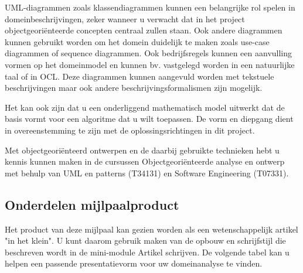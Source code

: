 UML‐diagrammen zoals klassendiagrammen kunnen een belangrijke rol spelen in
domeinbeschrijvingen, zeker wanneer u verwacht dat in het project
objectgeoriënteerde concepten centraal zullen staan. Ook andere diagrammen
kunnen gebruikt worden om het domein duidelijk te maken zoals use-case
diagrammen of sequence diagrammen. Ook bedrijfsregels kunnen een aanvulling
vormen op het domeinmodel en kunnen bv. vastgelegd worden in een natuurlijke
taal of in OCL. Deze diagrammen kunnen aangevuld worden met tekstuele
beschrijvingen maar ook andere beschrijvingsformalismen zijn mogelijk.

Het kan ook zijn dat u een onderliggend mathematisch model uitwerkt dat de basis
vormt voor een algoritme dat u wilt toepassen. De vorm en diepgang dient in
overeenstemming te zijn met de oplossingsrichtingen in dit project.

Met objectgeoriënteerd ontwerpen en de daarbij gebruikte technieken hebt u
kennis kunnen maken in de cursussen Objectgeoriënteerde analyse en ontwerp met
behulp van UML en patterns (T34131) en Software Engineering (T07331).

\subsection{Onderdelen mijlpaalproduct}
Het product van deze mijlpaal kan gezien worden als een wetenschappelijk artikel
"in het klein". U kunt daarom gebruik maken van de opbouw en schrijfstijl
die beschreven wordt in de mini-module Artikel schrijven. De volgende tabel
kan u helpen een passende presentatievorm voor uw domeinanalyse te vinden.


